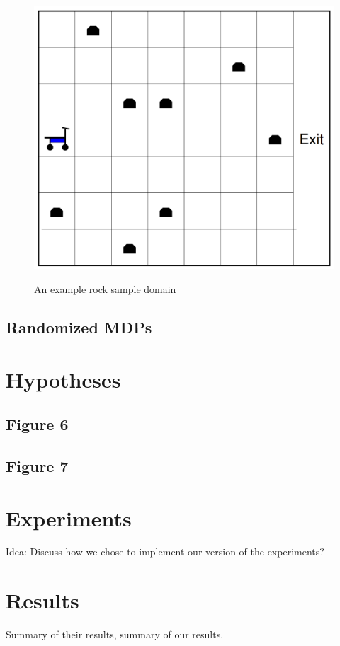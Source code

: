 \documentclass[11pt]{article} %
\begin{document}
\begin{figure}[h]
\label{fig: RockSample}
\centering
\includegraphics[page=1,width=.46\textwidth]{rock_sample_domain.png} \\
\caption{An example rock sample domain}
\end{figure}

\subsection{Randomized MDPs}

\section{Hypotheses}

\subsection{Figure 6}

\subsection{Figure 7}


\section{Experiments}

Idea: Discuss how we chose to implement our version of the experiments?



\section{Results}

Summary of their results, summary of our results.
\end{document}
